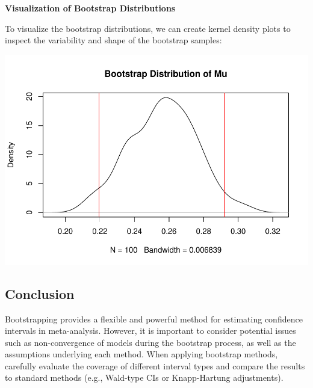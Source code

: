 \documentclass[
]{book}
\newenvironment{Shaded}{\begin{snugshade}}{\end{snugshade}}
\newcommand{\AttributeTok}[1]{\textcolor[rgb]{0.13,0.29,0.53}{#1}}
\newcommand{\CommentTok}[1]{\textcolor[rgb]{0.56,0.35,0.01}{\textit{#1}}}
\newcommand{\DecValTok}[1]{\textcolor[rgb]{0.00,0.00,0.81}{#1}}
\newcommand{\FloatTok}[1]{\textcolor[rgb]{0.00,0.00,0.81}{#1}}
\newcommand{\FunctionTok}[1]{\textcolor[rgb]{0.13,0.29,0.53}{\textbf{#1}}}
\newcommand{\NormalTok}[1]{#1}
\newcommand{\SpecialCharTok}[1]{\textcolor[rgb]{0.81,0.36,0.00}{\textbf{#1}}}
\newcommand{\StringTok}[1]{\textcolor[rgb]{0.31,0.60,0.02}{#1}}
\begin{document}
\textbf{Visualization of Bootstrap Distributions}

To visualize the bootstrap distributions, we can create kernel density plots to inspect the variability and shape of the bootstrap samples:

\begin{Shaded}
\end{Shaded}

\includegraphics{_main_files/figure-latex/unnamed-chunk-28-1.pdf}

\subsection{Conclusion}\label{conclusion-1}

Bootstrapping provides a flexible and powerful method for estimating confidence intervals in meta-analysis. However, it is important to consider potential issues such as non-convergence of models during the bootstrap process, as well as the assumptions underlying each method. When applying bootstrap methods, carefully evaluate the coverage of different interval types and compare the results to standard methods (e.g., Wald-type CIs or Knapp-Hartung adjustments).
\end{document}
